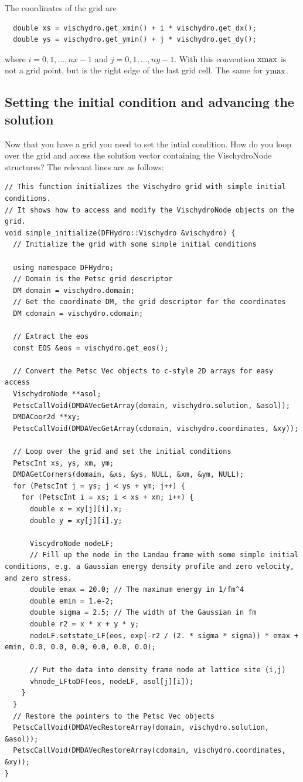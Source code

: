 \documentclass[12pt]{article}
\begin{document}
The coordinates of the grid are 
\begin{verbatim}
  double xs = vischydro.get_xmin() + i * vischydro.get_dx();
  double ys = vischydro.get_ymin() + j * vischydro.get_dy();
\end{verbatim}
where $i=0,1,...,nx-1$ and $j=0,1,...,ny-1$. With this convention ${\rm xmax}$ is not a grid point, but is the right edge of the last grid cell.  The same for ${\rm ymax}$.




\subsection{Setting the initial condition and advancing the solution}
Now that you have a grid you need to set the intial condition. How do you loop over the grid and access the solution vector containing the VischydroNode structures? The relevant lines are as follows:


\begin{verbatim}
// This function initializes the Vischydro grid with simple initial conditions.
// It shows how to access and modify the VischydroNode objects on the grid.
void simple_initialize(DFHydro::Vischydro &vischydro) {
  // Initialize the grid with some simple initial conditions

  using namespace DFHydro;
  // Domain is the Petsc grid descriptor
  DM domain = vischydro.domain;
  // Get the coordinate DM, the grid descriptor for the coordinates
  DM cdomain = vischydro.cdomain;

  // Extract the eos
  const EOS &eos = vischydro.get_eos();

  // Convert the Petsc Vec objects to c-style 2D arrays for easy access
  VischydroNode **asol;
  PetscCallVoid(DMDAVecGetArray(domain, vischydro.solution, &asol));
  DMDACoor2d **xy;
  PetscCallVoid(DMDAVecGetArray(cdomain, vischydro.coordinates, &xy));

  // Loop over the grid and set the initial conditions
  PetscInt xs, ys, xm, ym;
  DMDAGetCorners(domain, &xs, &ys, NULL, &xm, &ym, NULL);
  for (PetscInt j = ys; j < ys + ym; j++) {
    for (PetscInt i = xs; i < xs + xm; i++) {
      double x = xy[j][i].x;
      double y = xy[j][i].y;

      ViscydroNode nodeLF;
      // Fill up the node in the Landau frame with some simple initial conditions, e.g. a Gaussian energy density profile and zero velocity, and zero stress. 
      double emax = 20.0; // The maximum energy in 1/fm^4
      double emin = 1.e-2;
      double sigma = 2.5; // The width of the Gaussian in fm
      double r2 = x * x + y * y;
      nodeLF.setstate_LF(eos, exp(-r2 / (2. * sigma * sigma)) * emax + emin, 0.0, 0.0, 0.0, 0.0, 0.0, 0.0);
      
      // Put the data into density frame node at lattice site (i,j)
      vhnode_LFtoDF(eos, nodeLF, asol[j][i]);
    }
  }
  // Restore the pointers to the Petsc Vec objects
  PetscCallVoid(DMDAVecRestoreArray(domain, vischydro.solution, &asol));
  PetscCallVoid(DMDAVecRestoreArray(cdomain, vischydro.coordinates, &xy));
}
\end{verbatim}
\end{document}
